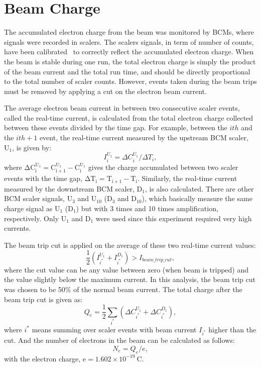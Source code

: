 \section{Beam Charge}
The accumulated electron charge from the beam was monitored by BCMs, where signals were recorded in scalers. The scalers signals, in term of number of counts, have been calibrated~\cite{bcm_patricia} to correctly reflect the accumulated electron charge. When the beam is stable during one run, the total electron charge is simply the product of the beam current and the total run time, and should be directly proportional to the total number of scaler counts. However, events taken during the beam trips must be removed by applying a cut on the electron beam current.

 The average electron beam current in between two consecutive scaler events, called the real-time current, is calculated from the total electron charge collected between these events divided by the time gap. For example, between the $ith$ and the $ith+1$ event, the real-time current measured by the upstream BCM scaler, $\mathrm{U_{1}}$, is given by:
\begin{equation}
  I_{i}^{U_{1}} = \Delta C_{i}^{U_{1}}/\Delta T_{i}, 
\end{equation}
where $\mathrm{\Delta C_{i}^{U_{1}} = C_{i+1}^{U_{1}} - C_{i}^{U_{1}}}$ gives the charge accumulated between two scaler events with the time gap, $\mathrm{\Delta T_{i}=T_{i+1}-T_{i}}$. Similarly, the real-time current measured by the downstream BCM scaler, $\mathrm{D_{1}}$, is also calculated. There are other BCM scaler signals, $\mathrm{U_{3}}$ and $\mathrm{U_{10}}$ ($\mathrm{D_{3}}$ and $\mathrm{D_{10}}$), which basically measure the same charge signal as $\mathrm{U_{1}}$ ($\mathrm{D_{1}}$) but with 3 times and 10 times amplification, respectively. Only $\mathrm{U_{1}}$ and $\mathrm{D_{1}}$ were used since this experiment required very high currents.

 The beam trip cut is applied on the average of these two real-time current values:
\begin{equation}
\frac{1}{2}(I_{i^{*}}^{U_{1}}+I_{i^{*}}^{D_{1}})>I_{beam\_trip\_cut},
\end{equation}
where the cut value can be any value between zero (when beam is tripped) and the value slightly below the maximum current. In this analysis, the beam trip cut was chosen to be 50\% of the normal beam current. The total charge after the beam trip cut is given as:
\begin{equation}
   Q_{e} = \frac{1}{2}\sum_{i^{*}}(\Delta C_{i^{*}}^{U_{1}}+\Delta C_{i^{*}}^{D_{1}}), 
  \label{eq_qe}
\end{equation}
where $i^{*}$ means summing over scaler events with beam current $I_{i^{*}}$ higher than the cut. And the number of electrons in the beam can be calculated as follows:
\begin{equation}
   N_{e} = Q_{e}/e, 
  \label{eq_ne}
\end{equation}
with the electron charge, $\mathrm{e=1.602\times 10^{-19}~C}$.

